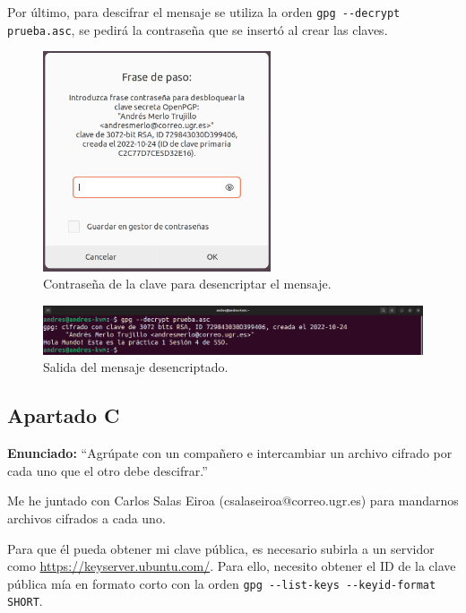 \documentclass{article}
\begin{document}
Por último, para descifrar el mensaje se utiliza la orden \verb|gpg --decrypt prueba.asc|, se pedirá la contraseña que se insertó al crear las claves.

\begin{figure}[H]
    \centering
    \includegraphics[width=0.6\textwidth]{imagenes/Portatil/Captura desde 2022-10-24 12-17-29.png}
    \caption{Contraseña de la clave para desencriptar el mensaje.}
\end{figure}

\begin{figure}[H]
    \includegraphics[width=\textwidth]{imagenes/Portatil/Captura desde 2022-10-27 18-35-01.png}
    \caption{Salida del mensaje desencriptado.}
\end{figure}


\subsection{Apartado C}

\textbf{Enunciado: }``Agrúpate con un compañero e intercambiar un archivo cifrado por cada uno que el otro debe descifrar.''

\bigskip

Me he juntado con Carlos Salas Eiroa (csalaseiroa@correo.ugr.es) para mandarnos archivos cifrados a cada uno.

Para que él pueda obtener mi clave pública, es necesario subirla a un servidor como \url{https://keyserver.ubuntu.com/}. Para ello, necesito obtener el ID de la clave pública mía en formato corto con la orden \verb|gpg --list-keys --keyid-format SHORT|.
\end{document}
